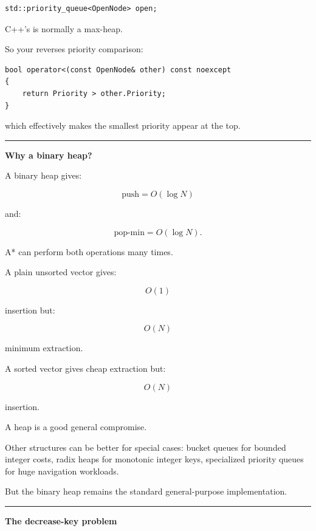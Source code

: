 \begin{verbatim}
std::priority_queue<OpenNode> open;
\end{verbatim}

C++'s  is normally a max-heap.

So your  reverses priority comparison:

\begin{verbatim}
bool operator<(const OpenNode& other) const noexcept
{
    return Priority > other.Priority;
}
\end{verbatim}

which effectively makes the smallest priority appear at the top.

\begin{center}\rule{0.5\linewidth}{0.5pt}\end{center}

\textbf{Why a binary heap?}

A binary heap gives:

\[
\text{push}=O(\log N)
\]

and:

\[
\text{pop-min}=O(\log N).
\]

A* can perform both operations many times.

A plain unsorted vector gives:

\[
O(1)
\]

insertion but:

\[
O(N)
\]

minimum extraction.

A sorted vector gives cheap extraction but:

\[
O(N)
\]

insertion.

A heap is a good general compromise.

Other structures can be better for special cases: bucket queues for bounded integer costs, radix heaps for monotonic integer keys, specialized priority queues for huge navigation workloads.

But the binary heap remains the standard general-purpose implementation.

\begin{center}\rule{0.5\linewidth}{0.5pt}\end{center}

\textbf{The decrease-key problem}

